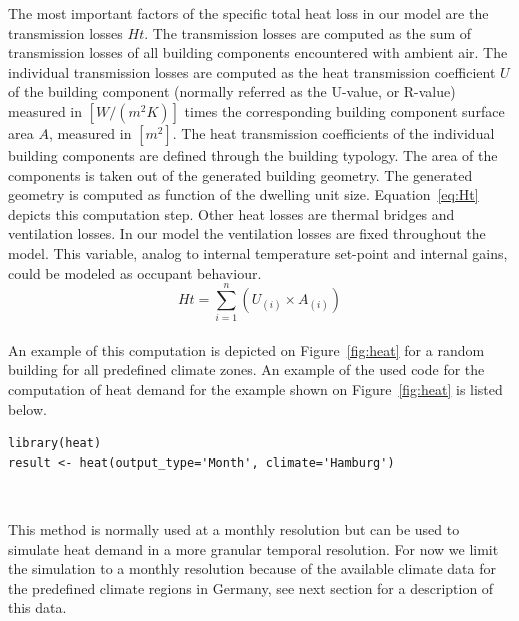 \documentclass[runningheads,a4paper]{llncs}
\begin{document}
The most important factors of the specific total heat loss in our model are the
transmission losses $Ht$. The transmission losses are computed as the sum of
transmission losses of all building components encountered with ambient air.
The individual transmission losses are computed as the heat transmission
coefficient $U$ of the building component (normally referred as the U-value, or
R-value) measured in $[W/(m^2K)]$ times the corresponding building component
surface area $A$, measured in $[m^2]$. The heat transmission coefficients of
the individual building components are defined through the building typology.
The area of the components is taken out of the generated building geometry. The
generated geometry is computed as function of the dwelling unit size. 
Equation~\ref{eq:Ht} depicts this computation step. Other heat losses are
thermal bridges and ventilation losses. In our model the ventilation losses
are fixed throughout the model. This variable, analog to internal temperature
set-point and internal gains, could be modeled as occupant behaviour.
\\

\begin{equation}\label{eq:Ht}
    Ht = \sum_{i=1}^{n} \left(U_{(i)} \times A_{(i)}\right)
\end{equation}
\\

An example of this computation is depicted on Figure~\ref{fig:heat} for a
random building for all predefined climate zones. An example of the used code
for the computation of heat demand for the example shown on Figure~\ref{fig:heat} is
listed below.\\

\begin{lstlisting}
library(heat)
result <- heat(output_type='Month', climate='Hamburg')
\end{lstlisting}
\\\vspace{0.5cm}

This method is normally used at a monthly resolution but can be used to
simulate heat demand in a more granular temporal resolution. For now we limit the
simulation to a monthly resolution because of the available climate data for
the predefined climate regions in Germany, see next section for a description of
this data.
\\
\end{document}
